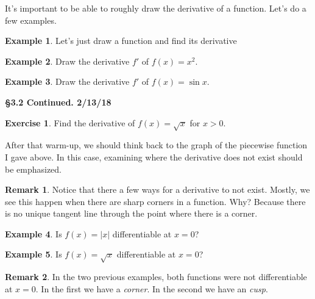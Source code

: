 \documentclass[leqno]{article}
\theoremstyle{definition}
\newtheorem{remark}{Remark}[section]
\newtheorem{example}{Example}[section]
\newtheorem{exercise}{Exercise}[section]
\theoremstyle{remark}
\theoremstyle{theorem}
\begin{document}
It's important to be able to roughly draw the derivative of a function.  Let's do a few examples.

\begin{example}
Let's just draw a function and find its derivative
\vspace*{8cm}\\
\end{example}

\begin{example}
Draw the derivative $f'$ of $f(x)=x^2$.
\vspace*{5cm}\\
\end{example}

\begin{example}
Draw the derivative $f'$ of $f(x)=\sin x$.
\vspace*{5cm}\\
\end{example}

\noindent \textbf{\Large{\S 3.2 Continued.  2/13/18}}

\begin{exercise}
Find the derivative of $f(x)=\sqrt{x}$ for $x>0$.
\vspace*{5cm}\\
\end{exercise}

After that warm-up, we should think back to the graph of the piecewise function I gave above.  In this case, examining where the derivative does not exist should be emphasized.  


\begin{remark}
Notice that there a few ways for a derivative to not exist.  Mostly, we see this happen when there are sharp corners in a function.  Why? Because there is no unique tangent line through the point where there is a corner.  
\end{remark}

\begin{example}
Is $f(x)=|x|$ differentiable at $x=0$? 
\vspace*{5cm}\\
\end{example}

\begin{example}
Is $f(x)=\sqrt{x}$ differentiable at $x=0$?
\vspace*{5cm}\\
\end{example}

\begin{remark}
In the two previous examples, both functions were not differentiable at $x=0$.  In the first we have a \emph{corner}. In the second we have an \emph{cusp}.
\end{remark}
\end{document}
